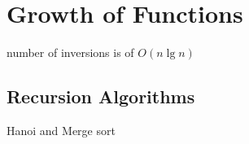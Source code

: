 \chapter{Growth of Functions}


number of inversions is of \(O(n \lg n)\)

\section{Recursion Algorithms}
Hanoi and Merge sort
